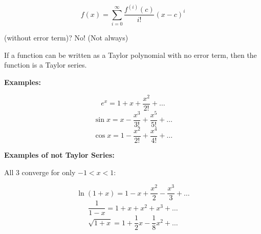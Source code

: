 $$ f(x) = \sum_{i=0}^{\infty} \frac{f^{(i)}(c)}{i!}(x - c)^i $$

(without error term)? \textrightarrow No! (Not always)

If a function can be written as a Taylor polynomial with no error term, then the function is a Taylor series.

\textbf{Examples:}

$$ e^x = 1 + x + \frac{x^2}{2!} + \dots $$
$$ \sin x = x - \frac{x^3}{3!} + \frac{x^5}{5!} + \dots $$
$$ \cos x = 1 - \frac{x^2}{2!} + \frac{x^4}{4!} + \dots $$

\textbf{Examples of not Taylor Series:}

All 3 converge for only $-1 < x < 1$:

$$ \ln(1 + x) = 1 - x + \frac{x^2}{2} - \frac{x^3}{3} + \dots $$
$$ \frac{1}{1 - x} = 1 + x + x^2 + x^3 + \dots $$
$$ \sqrt{1 + x} = 1 + \frac{1}{2}x - \frac{1}{8}x^2 + \dots $$
